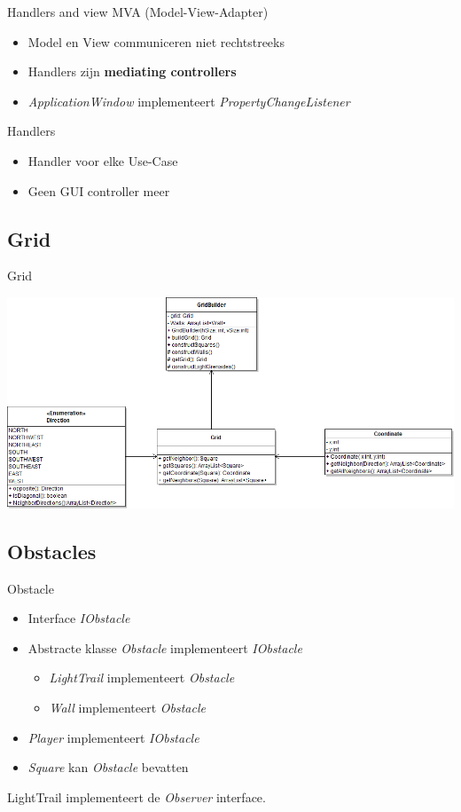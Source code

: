\documentclass[t]{beamer}
\begin{document}
\begin{frame}{Handlers and view}
MVA (Model-View-Adapter) 
\begin{itemize}
	\item Model en View communiceren niet rechtstreeks
	\item Handlers zijn \textbf{mediating controllers}
	\item \textit{ApplicationWindow} implementeert \textit{PropertyChangeListener}
\end{itemize}
Handlers
\begin{itemize}
	\item Handler voor elke Use-Case
	\item Geen GUI controller meer
\end{itemize}
\end{frame}

\subsection{Grid}
\begin{frame}{Grid}
\begin{center}
\includegraphics[width=\linewidth]{images/GridClass}
\end{center}
\end{frame}


\subsection{Obstacles}
\begin{frame}{Obstacle}
\begin{center}
\begin{itemize}
	\item Interface \textit{IObstacle}
	\item  Abstracte klasse \textit{Obstacle} implementeert \textit{IObstacle}
	\begin{itemize}
		\item \textit{LightTrail} implementeert \textit{Obstacle}
		\item \textit{Wall} implementeert \textit{Obstacle}
	\end{itemize}
	\item \textit{Player} implementeert \textit{IObstacle}
	\item \textit{Square} kan \textit{Obstacle} bevatten
\end{itemize}
LightTrail implementeert de \textit{Observer} interface.
\end{center}
\end{frame}
\end{document}
